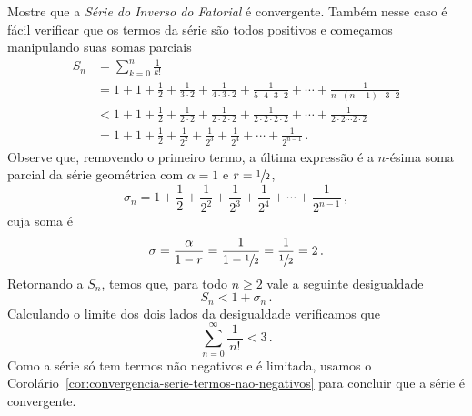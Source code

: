 \begin{example}
  Mostre que a
  \emph{Série do Inverso do Fatorial}
  é convergente.
  \solution
  Também nesse caso é fácil verificar que os termos da série são todos
  positivos e começamos manipulando suas somas parciais
  \begin{align*}
    S_n & = \sum_{k=0}^n \frac{1}{k!} \\[3mm]
        & = 1 + 1
        + \frac{1}{2}
        + \frac{1}{3\cdot2}
        + \frac{1}{4\cdot 3\cdot 2}
        + \frac{1}{5\cdot 4\cdot 3\cdot 2}
        + \cdots + \frac{1}{n\cdot (n-1)\cdots 3\cdot 2} \\[3mm]
        & < 1 + 1
        + \frac{1}{2}
        + \frac{1}{2\cdot2}
        + \frac{1}{2\cdot 2\cdot 2}
        + \frac{1}{2\cdot 2\cdot 2\cdot 2}
        + \cdots
        + \frac{1}{2\cdot 2\cdots 2\cdot 2} \\[3mm]
        & = 1 + 1
        + \frac{1}{2}
        + \frac{1}{2^2}
        + \frac{1}{2^3}
        + \frac{1}{2^4}
        + \cdots
        + \frac{1}{2^{n-1}}          \,.
  \end{align*}
  Observe que, removendo o primeiro termo, a última expressão é a
  $n$-ésima soma parcial da série geométrica
  com $\alpha=1$ e $r=\sfrac{1}{2}$,
  \[
    \sigma_n =  1
             + \frac{1}{2}
             + \frac{1}{2^2}
             + \frac{1}{2^3}
             + \frac{1}{2^4}
             + \cdots
             + \frac{1}{2^{n-1}}          \,,
  \]
  cuja soma é
  \[
    \sigma = \frac{\alpha}{1-r}
           = \frac{1}{1-\sfrac{1}{2}}
           = \frac{1}{\sfrac{1}{2}}
           = 2            \,.
  \]
  Retornando a $S_n$, temos que, para todo $n\geq 2$ vale a seguinte desigualdade
  \[
    S_n < 1 + \sigma_n      \,.
  \]
  Calculando o limite dos dois lados da desigualdade verificamos que
  \[
    \sum_{n=0}^\infty \frac{1}{\,n!\,} < 3           \,.
  \]
  Como a série só tem termos não negativos e é limitada, usamos o
  Corolário~\ref{cor:convergencia-serie-termos-nao-negativos}
  para concluir que a série é convergente.
\end{example}

